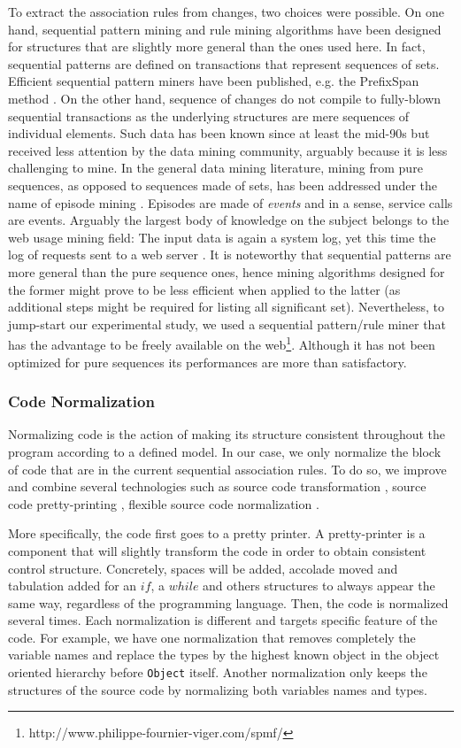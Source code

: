 To extract the association rules from changes,
two choices were possible. On one hand, sequential pattern mining and rule mining algorithms
have been designed for structures that are slightly more general than the ones used here.
In fact, sequential patterns are defined on transactions that represent sequences of sets.
Efficient sequential pattern miners have been published, e.g. the PrefixSpan method \cite{Pei2004}.
On the other hand, sequence of changes do not compile to fully-blown sequential transactions as the underlying structures are mere sequences of individual elements. Such data has been known since at least the mid-90s but received less attention by the data mining community, arguably because it is less challenging to mine. In the general data mining literature, mining from pure sequences, as opposed to sequences made of sets, has been addressed under the name of episode mining \cite{HEIKKI1997}. Episodes are made of \textit{events} and in a sense, service calls are events. Arguably the largest body of knowledge on the subject belongs to the web usage mining field: The input data is again a system log, yet this time the log of requests sent to a web server \cite{Pei2000}.
It is noteworthy that sequential patterns are more general than the pure sequence ones, hence mining algorithms designed for the former might prove to be less efficient when applied to the latter (as additional steps might be required for listing all significant set).
Nevertheless, to jump-start our experimental study, we used a sequential pattern/rule miner that has the advantage to be freely available on the web\footnote{http://www.philippe-fournier-viger.com/spmf/}. Although it has not been optimized for pure sequences its performances are more than satisfactory.

\subsubsection{Code Normalization\label{sec:resemble-normalization}}

Normalizing code is the action of making its structure consistent throughout the program according to a defined model. In our case, we only normalize the block of code that are in the current sequential association rules. To do so, we improve and combine several technologies such as source code transformation \cite{Cordy2006,Cordy2006a}, source code pretty-printing \cite{Roy2008}, flexible source code normalization \cite{Cordy2011}.

More specifically, the code first goes to a pretty printer. A pretty-printer is a component that will slightly transform the code in order to obtain consistent control structure. 
Concretely, spaces will be added, accolade moved and tabulation added for an $if$, a $while$ and others structures to always appear the same way, regardless of the programming language. 
Then, the code is normalized several times. Each normalization is different and targets specific feature of the code. 
For example, we have one normalization that removes completely the variable names and replace the types by the highest known object in the object oriented hierarchy before {\tt Object} itself. Another normalization only keeps the structures of the source code by normalizing both variables names and types.


